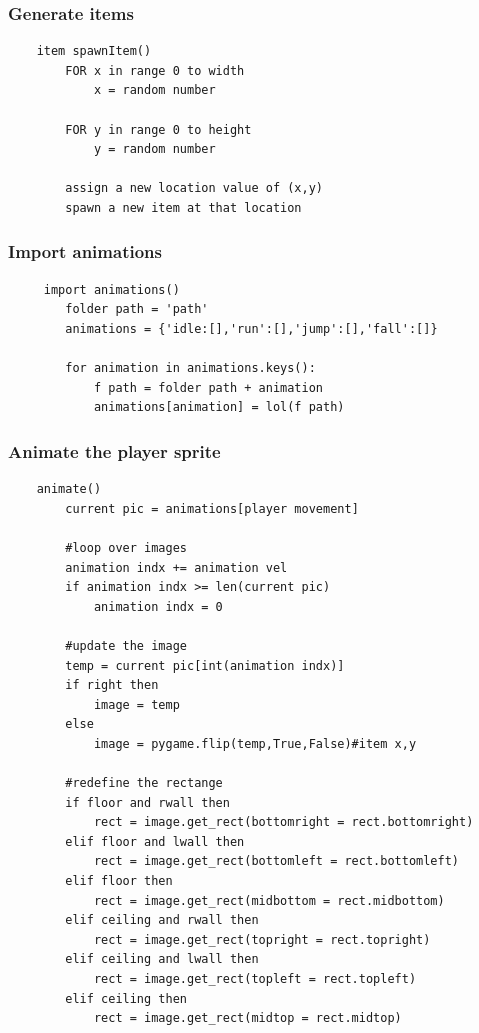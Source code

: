 \documentclass[12pt]{article}
\begin{document}
\subsubsection{Generate items}
\begin{verbatim}
    item spawnItem()
        FOR x in range 0 to width
            x = random number
            
        FOR y in range 0 to height
            y = random number
    
        assign a new location value of (x,y)
        spawn a new item at that location 
\end{verbatim}
\subsubsection{Import animations}
\begin{verbatim}
     import animations()
        folder path = 'path'
        animations = {'idle:[],'run':[],'jump':[],'fall':[]}

        for animation in animations.keys():
            f path = folder path + animation 
            animations[animation] = lol(f path)
\end{verbatim}
\subsubsection{Animate the player sprite}
\begin{verbatim}
    animate()
        current pic = animations[player movement]

        #loop over images
        animation indx += animation vel
        if animation indx >= len(current pic)
            animation indx = 0

        #update the image
        temp = current pic[int(animation indx)]
        if right then 
            image = temp
        else
            image = pygame.flip(temp,True,False)#item x,y

        #redefine the rectange
        if floor and rwall then
            rect = image.get_rect(bottomright = rect.bottomright)
        elif floor and lwall then
            rect = image.get_rect(bottomleft = rect.bottomleft)
        elif floor then
            rect = image.get_rect(midbottom = rect.midbottom)
        elif ceiling and rwall then
            rect = image.get_rect(topright = rect.topright)
        elif ceiling and lwall then
            rect = image.get_rect(topleft = rect.topleft)
        elif ceiling then
            rect = image.get_rect(midtop = rect.midtop)
\end{verbatim}
\end{document}
